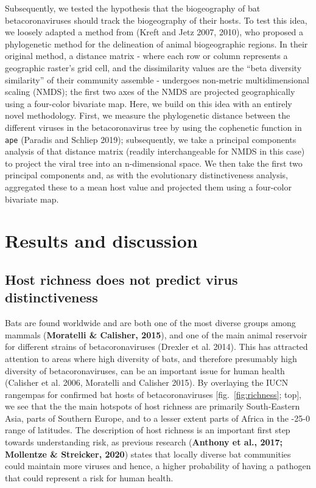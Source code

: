 \documentclass[11pt]{article}
\begin{document}
Subsequently, we tested the hypothesis that the biogeography of bat
betacoronaviruses should track the biogeography of their hosts. To test
this idea, we loosely adapted a method from (Kreft and Jetz 2007, 2010),
who proposed a phylogenetic method for the delineation of animal
biogeographic regions. In their original method, a distance matrix -
where each row or column represents a geographic raster's grid cell, and
the dissimilarity values are the ``beta diversity similarity'' of their
community assemble - undergoes non-metric multidimensional scaling
(NMDS); the first two axes of the NMDS are projected geographically
using a four-color bivariate map. Here, we build on this idea with an
entirely novel methodology. First, we measure the phylogenetic distance
between the different viruses in the betacoronavirus tree by using the
cophenetic function in \texttt{ape} (Paradis and Schliep 2019);
subsequently, we take a principal components analysis of that distance
matrix (readily interchangeable for NMDS in this case) to project the
viral tree into an n-dimensional space. We then take the first two
principal components and, as with the evolutionary distinctiveness
analysis, aggregated these to a mean host value and projected them using
a four-color bivariate map.

\hypertarget{results-and-discussion}{%
\section{Results and discussion}\label{results-and-discussion}}

\hypertarget{host-richness-does-not-predict-virus-distinctiveness}{%
\subsection{Host richness does not predict virus
distinctiveness}\label{host-richness-does-not-predict-virus-distinctiveness}}

Bats are found worldwide and are both one of the most diverse groups
among mammals (\textbf{Moratelli \& Calisher, 2015}), and one of the
main animal reservoir for different strains of betacoronaviruses
(Drexler et al. 2014). This has attracted attention to areas where high
diversity of bats, and therefore presumably high diversity of
betacoronaviruses, can be an important issue for human health (Calisher
et al. 2006, Moratelli and Calisher 2015). By overlaying the IUCN
rangempas for confirmed bat hosts of betacoronaviruses
{[}fig.~\ref{fig:richness}; top{]}, we see that the the main hotspots of
host richness are primarily South-Eastern Asia, parts of Southern
Europe, and to a lesser extent parts of Africa in the -25-0 range of
latitudes. The description of host richness is an important first step
towards understanding risk, as previous research (\textbf{Anthony et
al., 2017; Mollentze \& Streicker, 2020}) states that locally diverse
bat communities could maintain more viruses and hence, a higher
probability of having a pathogen that could represent a risk for human
health.
\end{document}
